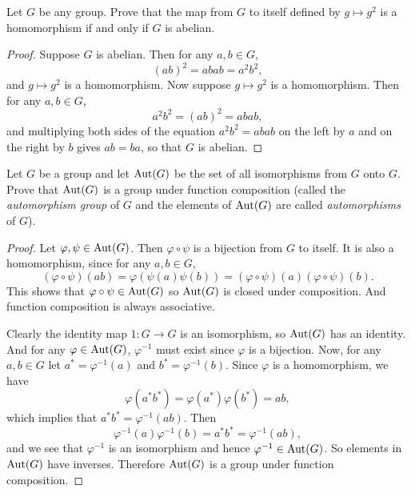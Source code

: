  Let $G$ be any group. Prove that the map from $G$ to
itself defined by $g\mapsto g^2$ is a homomorphism if and only if $G$
is abelian.
\begin{proof}
  Suppose $G$ is abelian. Then for any $a,b\in G$,
  \begin{equation*}
    (ab)^2 = abab = a^2b^2,
  \end{equation*}
  and $g\mapsto g^2$ is a homomorphism. Now suppose $g\mapsto g^2$ is
  a homomorphism. Then for any $a,b\in G$,
  \begin{equation*}
    a^2b^2 = (ab)^2 = abab,
  \end{equation*}
  and multiplying both sides of the equation $a^2b^2 = abab$ on the
  left by $a$ and on the right by $b$ gives $ab = ba$, so that $G$ is
  abelian.
\end{proof}

 Let $G$ be a group and let $\operatorname{Aut}(G)$ be the set of all
isomorphisms from $G$ onto $G$. Prove that $\operatorname{Aut}(G)$ is a group under
function composition (called the {\em automorphism group} of $G$ and
the elements of $\operatorname{Aut}(G)$ are called {\em automorphisms} of $G$).
\begin{proof}
  Let $\varphi,\psi\in\operatorname{Aut}(G)$. Then $\varphi\circ\psi$ is a bijection
  from $G$ to itself. It is also a homomorphism, since for any
  $a,b\in G$,
  \begin{equation*}
    (\varphi\circ\psi)(ab) = \varphi(\psi(a)\psi(b))
    = (\varphi\circ\psi)(a)(\varphi\circ\psi)(b).
  \end{equation*}
  This shows that $\varphi\circ\psi\in\operatorname{Aut}(G)$ so $\operatorname{Aut}(G)$ is closed
  under composition. And function composition is always associative.

  Clearly the identity map $1\colon G\to G$ is an isomorphism, so
  $\operatorname{Aut}(G)$ has an identity. And for any $\varphi\in\operatorname{Aut}(G)$,
  $\varphi^{-1}$ must exist since $\varphi$ is a bijection. Now, for
  any $a,b\in G$ let $a^* = \varphi^{-1}(a)$ and
  $b^* = \varphi^{-1}(b)$. Since $\varphi$ is a homomorphism, we have
  \begin{equation*}
    \varphi(a^*b^*) = \varphi(a^*)\varphi(b^*) = ab,
  \end{equation*}
  which implies that $a^*b^* = \varphi^{-1}(ab)$. Then
  \begin{equation*}
    \varphi^{-1}(a)\varphi^{-1}(b) = a^*b^* = \varphi^{-1}(ab),
  \end{equation*}
  and we see that $\varphi^{-1}$ is an isomorphism and hence
  $\varphi^{-1}\in\operatorname{Aut}(G)$. So elements in $\operatorname{Aut}(G)$ have
  inverses. Therefore $\operatorname{Aut}(G)$ is a group under function composition.
\end{proof}
